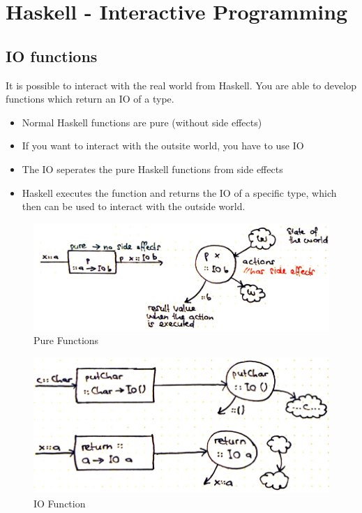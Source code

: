 \hypertarget{haskell}{%
\section{Haskell - Interactive Programming}\label{haskell}}

\hypertarget{io-functions}{%
\subsection{IO functions}\label{io-functions}}

It is possible to interact with the real world from Haskell. You are
able to develop functions which return an IO of a type.

\begin{itemize}
\tightlist
\item
  Normal Haskell functions are pure (without side effects)
\item
  If you want to interact with the outsite world, you have to use IO
\item
  The IO seperates the pure Haskell functions from side effects
\item
  Haskell executes the function and returns the IO of a specific type,
  which then can be used to interact with the outside world.
\end{itemize}

\begin{figure}[H]
\centering
\includegraphics[width=1\textwidth]{figures/pureHaskellFunctions.png}
\caption{Pure Functions}
\end{figure}

\begin{figure}[H]
\centering
\includegraphics[width=1\textwidth]{figures/ioHaskellFunction.png}
\caption{IO Function}
\end{figure}

